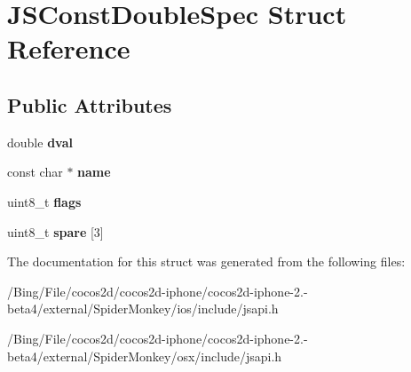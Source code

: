 \hypertarget{struct_j_s_const_double_spec}{\section{J\-S\-Const\-Double\-Spec Struct Reference}
\label{struct_j_s_const_double_spec}
}
\subsection*{Public Attributes}
\begin{DoxyCompactItemize}
\item 
\hypertarget{struct_j_s_const_double_spec_aa31fa0367de76d319ddeecff2d2e7299}{double {\bfseries dval}}\label{struct_j_s_const_double_spec_aa31fa0367de76d319ddeecff2d2e7299}

\item 
\hypertarget{struct_j_s_const_double_spec_a48507f3e2b3140b95d50ecde879d5a7b}{const char $\ast$ {\bfseries name}}\label{struct_j_s_const_double_spec_a48507f3e2b3140b95d50ecde879d5a7b}

\item 
\hypertarget{struct_j_s_const_double_spec_a28893997a004a8ee238ed015e2a00afe}{uint8\-\_\-t {\bfseries flags}}\label{struct_j_s_const_double_spec_a28893997a004a8ee238ed015e2a00afe}

\item 
\hypertarget{struct_j_s_const_double_spec_a36def0150962d0017d57282ad3a09039}{uint8\-\_\-t {\bfseries spare} \mbox{[}3\mbox{]}}\label{struct_j_s_const_double_spec_a36def0150962d0017d57282ad3a09039}

\end{DoxyCompactItemize}


The documentation for this struct was generated from the following files\-:\begin{DoxyCompactItemize}
\item 
/\-Bing/\-File/cocos2d/cocos2d-\/iphone/cocos2d-\/iphone-\/2.-\/beta4/external/\-Spider\-Monkey/ios/include/jsapi.\-h\item 
/\-Bing/\-File/cocos2d/cocos2d-\/iphone/cocos2d-\/iphone-\/2.-\/beta4/external/\-Spider\-Monkey/osx/include/jsapi.\-h\end{DoxyCompactItemize}
